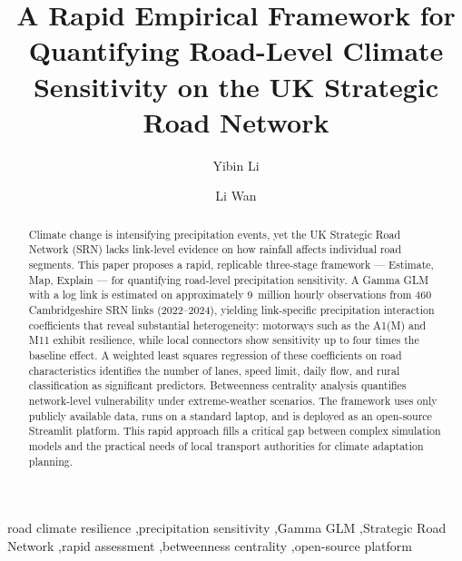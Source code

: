 \documentclass[review]{elsarticle}
\begin{document}
\begin{frontmatter}

\title{A Rapid Empirical Framework for Quantifying Road-Level Climate Sensitivity on the UK Strategic Road Network}

\author[cam]{Yibin Li}
\author[cam]{Li Wan}


\begin{abstract}
Climate change is intensifying precipitation events, yet the UK Strategic Road Network (SRN) lacks link-level evidence on how rainfall affects individual road segments. This paper proposes a rapid, replicable three-stage framework --- Estimate, Map, Explain --- for quantifying road-level precipitation sensitivity. A Gamma GLM with a log link is estimated on approximately 9~million hourly observations from 460 Cambridgeshire SRN links (2022--2024), yielding link-specific precipitation interaction coefficients that reveal substantial heterogeneity: motorways such as the A1(M) and M11 exhibit resilience, while local connectors show sensitivity up to four times the baseline effect. A weighted least squares regression of these coefficients on road characteristics identifies the number of lanes, speed limit, daily flow, and rural classification as significant predictors. Betweenness centrality analysis quantifies network-level vulnerability under extreme-weather scenarios. The framework uses only publicly available data, runs on a standard laptop, and is deployed as an open-source Streamlit platform. This rapid approach fills a critical gap between complex simulation models and the practical needs of local transport authorities for climate adaptation planning.
\end{abstract}

\begin{keyword}
road climate resilience \sep precipitation sensitivity \sep Gamma GLM \sep Strategic Road Network \sep rapid assessment \sep betweenness centrality \sep open-source platform
\end{keyword}

\end{frontmatter}

\end{document}
